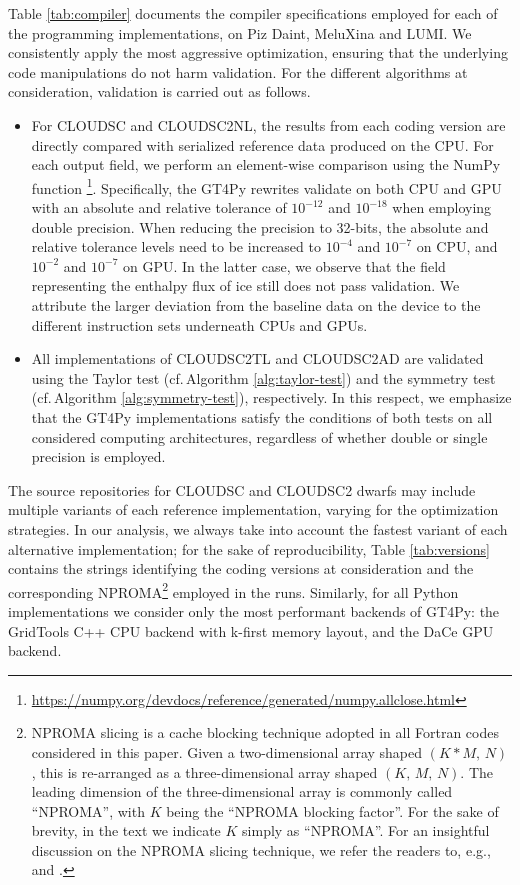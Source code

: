 \documentclass[gmd,manuscript,online]{copernicus}
\theoremstyle{theorem}
\theoremstyle{definition}
\theoremstyle{remark}
\theoremstyle{proposition}
\begin{document}
	\noindent Table \ref{tab:compiler} documents the compiler specifications employed for each of the programming implementations, on Piz Daint, MeluXina and LUMI. We consistently apply the most aggressive optimization, ensuring that the underlying code manipulations do not harm validation. For the different algorithms at consideration, validation is carried out as follows.
	\begin{itemize}
		\item For CLOUDSC and CLOUDSC2NL, the results from each coding version are directly compared with serialized reference data produced on the CPU. For each output field, we perform an element-wise comparison using the NumPy function \footnote{\url{https://numpy.org/devdocs/reference/generated/numpy.allclose.html}}. Specifically, the GT4Py rewrites validate on both CPU and GPU with an absolute and relative tolerance of $10^{-12}$ and $10^{-18}$ when employing double precision. When reducing the precision to 32-bits, the absolute and relative tolerance levels need to be increased to $10^{-4}$ and $10^{-7}$ on CPU, and $10^{-2}$ and $10^{-7}$ on GPU. In the latter case, we observe that the field representing the enthalpy flux of ice still does not pass validation. We attribute the larger deviation from the baseline data on the device to the different instruction sets underneath CPUs and GPUs.
		\item All implementations of CLOUDSC2TL and CLOUDSC2AD are validated using the Taylor test (cf.\,Algorithm \ref{alg:taylor-test}) and the symmetry test (cf.\,Algorithm \ref{alg:symmetry-test}), respectively. In this respect, we emphasize that the GT4Py implementations satisfy the conditions of both tests on all considered computing architectures, regardless of whether double or single precision is employed.
	\end{itemize}
	\noindent The source repositories for CLOUDSC and CLOUDSC2 dwarfs may include multiple variants of each reference implementation, varying for the optimization strategies. In our analysis, we always take into account the fastest variant of each alternative implementation; for the sake of reproducibility, Table \ref{tab:versions} contains the strings identifying the coding versions at consideration and the corresponding NPROMA\footnote{NPROMA slicing is a cache blocking technique adopted in all Fortran codes considered in this paper. Given a two-dimensional array shaped $(K * M, \, N)$, this is re-arranged as a three-dimensional array shaped $(K, \, M, \, N)$. The leading dimension of the three-dimensional array is commonly called ``NPROMA'', with $K$ being the ``NPROMA blocking factor''. For the sake of brevity, in the text we indicate $K$ simply as ``NPROMA''. For an insightful discussion on the NPROMA slicing technique, we refer the readers to, e.g., \citet{muller19} and \citet{bauer20}.} employed in the runs. Similarly, for all Python implementations we consider only the most performant backends of GT4Py: the GridTools C++ CPU backend with k-first memory layout, and the DaCe GPU backend.
\end{document}
